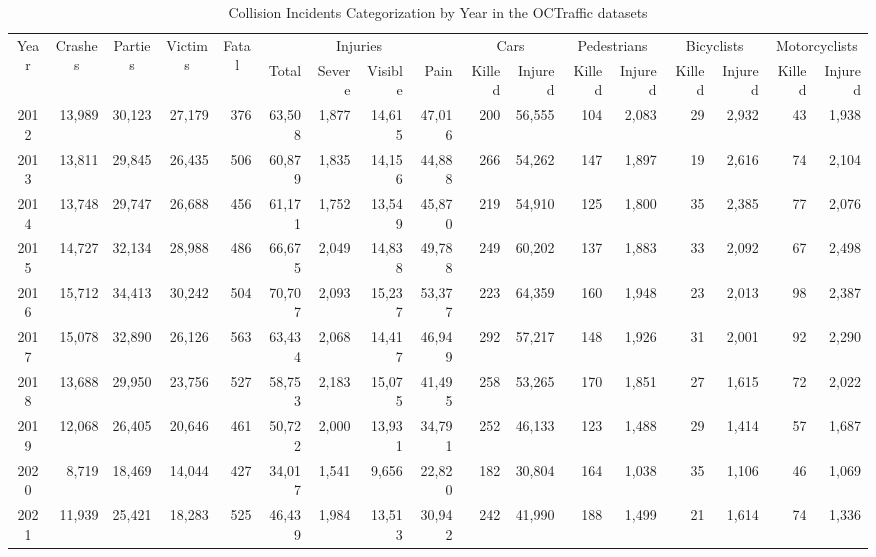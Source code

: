 \begin{table}
\caption{Collision Incidents Categorization by Year in the OCTraffic datasets}
\label{tbl5}
\begin{tabular}{crrrrrrrrrrrrrrrr}
\toprule
\multirow[c]{2}{*}{Year} & \multicolumn{1}{c}{\multirow{2}{*}{Crashes}} & \multicolumn{1}{c}{\multirow{2}{*}{Parties}} & \multicolumn{1}{c}{\multirow{2}{*}{Victims}} & \multicolumn{1}{c}{\multirow{2}{*}{Fatal}} & \multicolumn{4}{c}{Injuries} & \multicolumn{2}{c}{Cars} & \multicolumn{2}{c}{Pedestrians} & \multicolumn{2}{c}{Bicyclists} & \multicolumn{2}{c}{Motorcyclists} \\
\cmidrule{6-9}\cmidrule{10-11}\cmidrule{12-13}\cmidrule{14-15}\cmidrule{16-17}
&  &  &  &  & {Total} & {Severe} & {Visible} & {Pain} & {Killed} & {Injured} & {Killed} & {Injured} & {Killed} & {Injured} & {Killed} & {Injured} \\
\midrule
2012 & 13,989 & 30,123 & 27,179 & 376 & 63,508 & 1,877 & 14,615 & 47,016 & 200 & 56,555 & 104 & 2,083 & 29 & 2,932 & 43 & 1,938 \\
2013 & 13,811 & 29,845 & 26,435 & 506 & 60,879 & 1,835 & 14,156 & 44,888 & 266 & 54,262 & 147 & 1,897 & 19 & 2,616 & 74 & 2,104 \\
2014 & 13,748 & 29,747 & 26,688 & 456 & 61,171 & 1,752 & 13,549 & 45,870 & 219 & 54,910 & 125 & 1,800 & 35 & 2,385 & 77 & 2,076 \\
2015 & 14,727 & 32,134 & 28,988 & 486 & 66,675 & 2,049 & 14,838 & 49,788 & 249 & 60,202 & 137 & 1,883 & 33 & 2,092 & 67 & 2,498 \\
2016 & 15,712 & 34,413 & 30,242 & 504 & 70,707 & 2,093 & 15,237 & 53,377 & 223 & 64,359 & 160 & 1,948 & 23 & 2,013 & 98 & 2,387 \\
2017 & 15,078 & 32,890 & 26,126 & 563 & 63,434 & 2,068 & 14,417 & 46,949 & 292 & 57,217 & 148 & 1,926 & 31 & 2,001 & 92 & 2,290 \\
2018 & 13,688 & 29,950 & 23,756 & 527 & 58,753 & 2,183 & 15,075 & 41,495 & 258 & 53,265 & 170 & 1,851 & 27 & 1,615 & 72 & 2,022 \\
2019 & 12,068 & 26,405 & 20,646 & 461 & 50,722 & 2,000 & 13,931 & 34,791 & 252 & 46,133 & 123 & 1,488 & 29 & 1,414 & 57 & 1,687 \\
2020 & 8,719 & 18,469 & 14,044 & 427 & 34,017 & 1,541 & 9,656 & 22,820 & 182 & 30,804 & 164 & 1,038 & 35 & 1,106 & 46 & 1,069 \\
2021 & 11,939 & 25,421 & 18,283 & 525 & 46,439 & 1,984 & 13,513 & 30,942 & 242 & 41,990 & 188 & 1,499 & 21 & 1,614 & 74 & 1,336 \\

\end{tabular}
\end{table}
